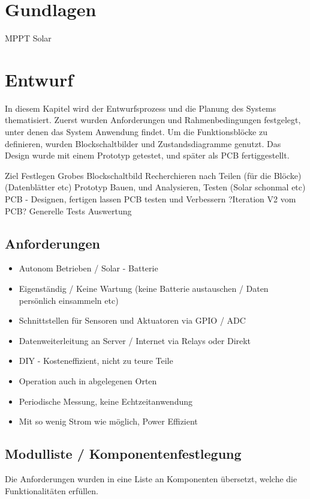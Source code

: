 \section{Gundlagen}

MPPT Solar





\section{Entwurf}

In diesem Kapitel wird der Entwurfsprozess und die Planung des Systems thematisiert.
Zuerst wurden Anforderungen und Rahmenbedingungen festgelegt, unter denen das System Anwendung findet. Um die Funktionsblöcke zu definieren, wurden Blockschaltbilder und Zustandsdiagramme genutzt. Das Design wurde mit einem Prototyp getestet, und später als \ac{PCB} fertiggestellt.

Ziel Festlegen
Grobes Blockschaltbild
Recherchieren nach Teilen (für die Blöcke) (Datenblätter etc)
Prototyp Bauen, und Analysieren, Testen (Solar schonmal etc)
PCB - Designen, fertigen lassen
PCB testen und Verbessern
?Iteration V2 vom PCB?
Generelle Tests
Auswertung

\subsection{Anforderungen}
\begin{itemize}
    \item Autonom Betrieben / Solar - Batterie
    \item Eigenständig / Keine Wartung (keine Batterie austauschen / Daten persönlich einsammeln etc)
    \item Schnittstellen für Sensoren und Aktuatoren via \ac{GPIO} / \ac{ADC} 
    \item Datenweiterleitung an Server / Internet via Relays oder Direkt
    \item DIY - Kosteneffizient, nicht zu teure Teile
    \item Operation auch in abgelegenen Orten
    \item Periodische Messung, keine Echtzeitanwendung
    \item Mit so wenig Strom wie möglich, Power Effizient
\end{itemize}

\subsection{Modulliste / Komponentenfestlegung}
Die Anforderungen wurden in eine Liste an Komponenten übersetzt, welche die Funktionalitäten erfüllen.

